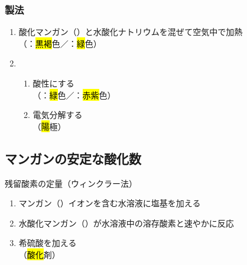  \subsubsection{製法}
 \begin{enumerate}
  \item 酸化マンガン（）と水酸化ナトリウムを混ぜて空気中で加熱\\
  （：\hl{黒褐}色／：\hl{緑}色）
  \item
  \begin{enumerate}
  \item 酸性にする\\
  （：\hl{緑}色／：\hl{赤紫}色）
  \item 電気分解する\\
  （\hl{陽}極）
  \end{enumerate}
 \end{enumerate}
 \subsection{マンガンの安定な酸化数}
 残留酸素の定量（ウィンクラー法）
 \begin{enumerate}
  \item マンガン（）イオンを含む水溶液に塩基を加える\\
  \item 水酸化マンガン（）が水溶液中の溶存酸素と速やかに反応\\
  \item 希硫酸を加える\\
  （\hl{酸化}剤）
 \end{enumerate}